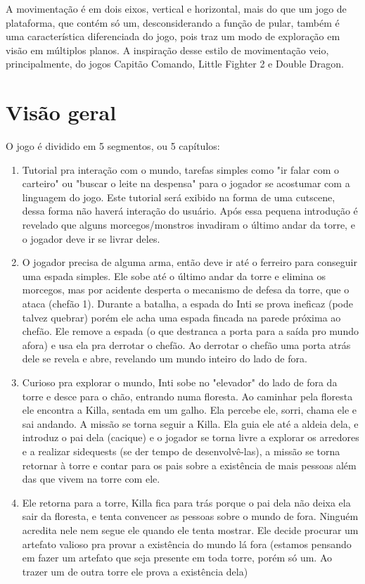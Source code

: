 \documentclass[12pt]{article}
\begin{document}
A movimentação é em dois eixos, vertical e horizontal, mais do que um jogo de
plataforma, que contém só um, desconsiderando a função de pular, também é uma
característica diferenciada do jogo, pois traz um modo de exploração em visão
em múltiplos planos. A inspiração desse estilo de movimentação veio,
principalmente, do jogos Capitão Comando, Little Fighter 2 e Double Dragon.

\section{Visão geral}
O jogo é dividido em 5 segmentos, ou 5 capítulos:
\begin{enumerate}
\item Tutorial pra interação com o mundo, tarefas simples como "ir falar com o carteiro" ou "buscar o leite na despensa" para o jogador se acostumar com a linguagem do jogo. Este tutorial será exibido na forma de uma cutscene, dessa forma não haverá interação do usuário.
Após essa pequena introdução é revelado que alguns morcegos/monstros invadiram o último andar da torre, e o jogador deve ir se livrar deles.
\item O jogador precisa de alguma arma, então deve ir até o ferreiro para conseguir uma espada simples. Ele sobe até o último andar da torre e elimina os morcegos, mas por acidente desperta o mecanismo de defesa da torre, que o ataca (chefão 1).
Durante a batalha, a espada do Inti se prova ineficaz (pode talvez quebrar) porém ele acha uma espada fincada na parede próxima ao chefão. Ele remove a espada (o que destranca a porta para a saída pro mundo afora) e usa ela pra derrotar o chefão.
Ao derrotar o chefão uma porta atrás dele se revela e abre, revelando um mundo inteiro do lado de fora.
\item Curioso pra explorar o mundo, Inti sobe no "elevador" do lado de fora da torre e desce para o chão, entrando numa floresta.
Ao caminhar pela floresta ele encontra a Killa, sentada em um galho. Ela percebe ele, sorri, chama ele e sai andando. A missão se torna seguir a Killa.
Ela guia ele até a aldeia dela, e introduz o pai dela (cacique) e o jogador se torna livre a explorar os arredores e a realizar sidequests (se der tempo de desenvolvê-las), a missão se torna retornar à torre e contar para os pais sobre a existência de mais pessoas além das que vivem na torre com ele.
\item Ele retorna para a torre, Killa fica para trás porque o pai dela não deixa ela sair da floresta, e tenta convencer as pessoas sobre o mundo de fora. Ninguém acredita nele nem segue ele quando ele tenta mostrar. Ele decide procurar um artefato valioso pra provar a existência do mundo lá fora (estamos pensando em fazer um artefato que seja presente em toda torre, porém só um. Ao trazer um de outra torre ele prova a existência dela)

\end{enumerate}
\end{document}
